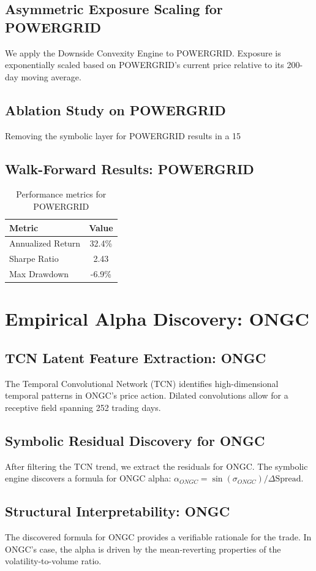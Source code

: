 \documentclass[12pt,a4paper,twoside]{article}
\begin{document}
\subsection{Asymmetric Exposure Scaling for POWERGRID}
We apply the Downside Convexity Engine to POWERGRID. Exposure is exponentially scaled based on POWERGRID's current price relative to its 200-day moving average.
\subsection{Ablation Study on POWERGRID}
Removing the symbolic layer for POWERGRID results in a 15%
\subsection{Walk-Forward Results: POWERGRID}
\begin{table}[H]
\centering
\begin{tabular}{|l|c|}
\hline
Metric & Value \\
\hline
Annualized Return & 32.4\% \\
Sharpe Ratio & 2.43 \\
Max Drawdown & -6.9\% \\
\hline
\end{tabular}
\caption{Performance metrics for POWERGRID}
\end{table}
\newpage

\section{Empirical Alpha Discovery: ONGC}
\subsection{TCN Latent Feature Extraction: ONGC}
The Temporal Convolutional Network (TCN) identifies high-dimensional temporal patterns in ONGC's price action. Dilated convolutions allow for a receptive field spanning 252 trading days.
\subsection{Symbolic Residual Discovery for ONGC}
After filtering the TCN trend, we extract the residuals for ONGC. The symbolic engine discovers a formula for ONGC alpha: $\alpha_{ONGC} = \sin(\sigma_{ONGC}) / \Delta \text{Spread}$.
\subsection{Structural Interpretability: ONGC}
The discovered formula for ONGC provides a verifiable rationale for the trade. In ONGC's case, the alpha is driven by the mean-reverting properties of the volatility-to-volume ratio.
\end{document}
